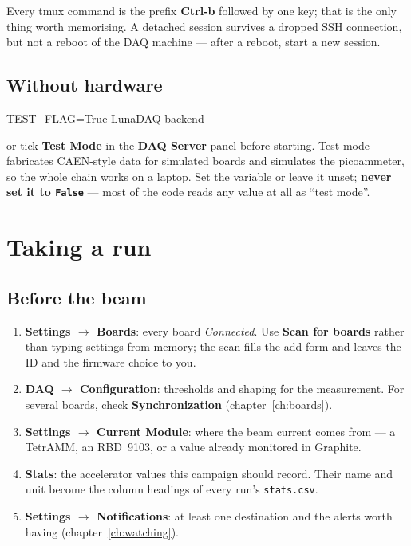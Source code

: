 \documentclass[11pt,a4paper]{report}
\newcommand{\cmd}[1]{\texttt{#1}}
\newcommand{\ui}[1]{\textbf{#1}}          %
\newcommand{\file}[1]{\texttt{#1}}
\begin{document}
Every tmux command is the prefix \textbf{Ctrl-b} followed by one key; that is the
only thing worth memorising. A detached session survives a dropped SSH
connection, but not a reboot of the DAQ machine --- after a reboot, start a new
session.

\section{Without hardware}

\begin{shell}
TEST_FLAG=True LunaDAQ backend
\end{shell}

or tick \ui{Test Mode} in the \ui{DAQ Server} panel before starting. Test mode
fabricates CAEN-style data for simulated boards and simulates the picoammeter, so
the whole chain works on a laptop. Set the variable or leave it unset;
\textbf{never set it to \cmd{False}} --- most of the code reads any value at all
as ``test mode''.

\chapter{Taking a run}

\section{Before the beam}

\begin{enumerate}
  \item \ui{Settings $\rightarrow$ Boards}: every board \emph{Connected}. Use
        \ui{Scan for boards} rather than typing settings from memory; the scan
        fills the add form and leaves the ID and the firmware choice to you.
  \item \ui{DAQ $\rightarrow$ Configuration}: thresholds and shaping for the
        measurement. For several boards, check \ui{Synchronization}
        (chapter~\ref{ch:boards}).
  \item \ui{Settings $\rightarrow$ Current Module}: where the beam current comes
        from --- a TetrAMM, an RBD~9103, or a value already monitored in Graphite.
  \item \ui{Stats}: the accelerator values this campaign should record. Their
        name and unit become the column headings of every run's
        \file{stats.csv}.
  \item \ui{Settings $\rightarrow$ Notifications}: at least one destination and
        the alerts worth having (chapter~\ref{ch:watching}).
\end{enumerate}
\end{document}
